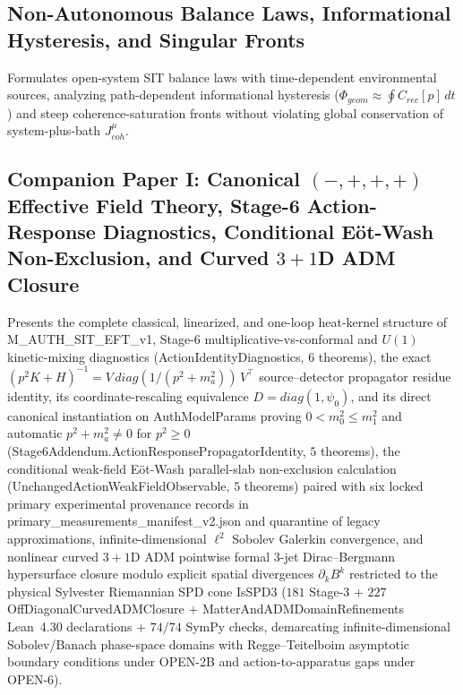 \documentclass[american,11pt,letterpaper]{article}
\def\mathrm#1{#1}%
\def\texttt#1{#1}%
\begin{document}
\subsection{Non-Autonomous Balance Laws, Informational Hysteresis, and Singular Fronts}

Formulates open-system SIT balance laws with time-dependent environmental sources, analyzing path-dependent informational hysteresis ($\Phi_{\mathrm{geom}} \approx \oint C_{\mathrm{rec}}[p]\,dt$) and steep coherence-saturation fronts without violating global conservation of system-plus-bath $J^\mu_{\mathrm{coh}}$.

\subsection{Companion Paper I: Canonical $(-,+,+,+)$ Effective Field Theory, Stage-6 Action-Response Diagnostics, Conditional E\"ot-Wash Non-Exclusion, and Curved $3+1$D ADM Closure}

Presents the complete classical, linearized, and one-loop heat-kernel structure of \texttt{M\_AUTH\_SIT\_EFT\_v1}, Stage-6 multiplicative-vs-conformal and $U(1)$ kinetic-mixing diagnostics (\texttt{ActionIdentityDiagnostics}, $6$ theorems), the exact $(p^2 K + H)^{-1} = V\,\mathrm{diag}(1/(p^2+m_a^2))\,V^\top$ source--detector propagator residue identity, its coordinate-rescaling equivalence $D = \mathrm{diag}(1,\psi_0)$, and its direct canonical instantiation on \texttt{AuthModelParams} proving $0 < m_0^2 \le m_1^2$ and automatic $p^2 + m_a^2 \ne 0$ for $p^2 \ge 0$ (\texttt{Stage6Addendum.\allowbreak{}ActionResponsePropagatorIdentity}, $5$ theorems), the conditional weak-field E\"ot-Wash parallel-slab non-exclusion calculation (\texttt{UnchangedActionWeakFieldObservable}, $5$ theorems) paired with six locked primary experimental provenance records in \texttt{primary\_measurements\_manifest\_v2.json} and quarantine of legacy approximations, infinite-dimensional $\ell^2$ Sobolev Galerkin convergence, and nonlinear curved $3+1$D ADM pointwise formal 3-jet Dirac--Bergmann hypersurface closure modulo explicit spatial divergences $\partial_k B^k$ restricted to the physical Sylvester Riemannian SPD cone \texttt{IsSPD3} ($181$ Stage-3 + $227$ \texttt{Off\allowbreak{}Diagonal\allowbreak{}Curved\allowbreak{}ADMClosure} + \texttt{Matter\allowbreak{}And\allowbreak{}ADMDomain\allowbreak{}Refinements} Lean~4.30 declarations + $74/74$ SymPy checks, demarcating infinite-dimensional Sobolev/Banach phase-space domains with Regge--Teitelboim asymptotic boundary conditions under \texttt{OPEN-2B} and action-to-apparatus gaps under \texttt{OPEN-6}).
\end{document}
